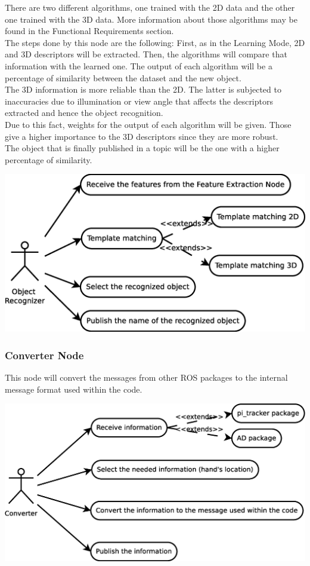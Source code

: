 \documentclass{article}
\begin{document}
There are two different algorithms, one trained with the 2D data and the other one trained with the 3D data. More information about those algorithms may be found in the Functional Requirements section. 
\\
The steps done by this node are the following: 
First, as in the Learning Mode, 2D and 3D descriptors will be extracted. Then, the algorithms will compare that information with the learned one. 
The output of each algorithm will be a percentage of similarity between the dataset and the new object. 
\\
The 3D information is more reliable than the 2D. The latter is subjected to inaccuracies due to illumination or view angle that affects the descriptors extracted and hence the object recognition.
\\
Due to this fact, weights for the output of each algorithm will be given. Those give a higher importance to the 3D descriptors since they are more robust. 
\\
The object that is finally published in a topic will be the one with a higher percentage of similarity. 

\begin{center}
	\includegraphics[scale=0.4]{../diagrams/images/uc_recognizer.eps}
\end{center}

\subsubsection{Converter Node}

This node will convert the messages from other ROS packages to the internal message format used within the code. 

\begin{center}
	\includegraphics[scale=0.4]{../diagrams/images/uc_converter.eps}
\end{center}
	
\end{document}
